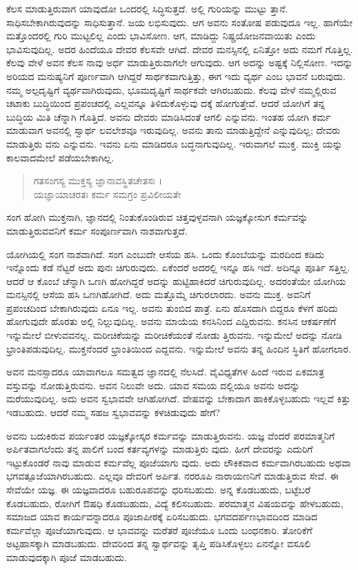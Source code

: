 ಕೆಲಸ ಮಾಡುತ್ತಿರುವಾಗ ಯಾವುದೋ ಒಂದರಲ್ಲಿ ಸಿದ್ಧಿಸುತ್ತದೆ. ಅಲ್ಲಿ ಗುರಿಯನ್ನು ಮುಟ್ಟು ತ್ತಾನೆ. ಸಾಧಿಸಬೇಕಾಗಿರುವುದನ್ನು ಸಾಧಿಸುತ್ತಾನೆ. ಜಯ ಲಭಿಸುವುದು. ಆಗ ಅವನು ಸಂತೋಷ ಪಡುವುದೂ ಇಲ್ಲ. ಹಾಗೆಯೇ ಮತ್ತೊಂದರಲ್ಲಿ ಗುರಿ ಮುಟ್ಟಲಿಲ್ಲ ಎಂದು ಭಾವಿಸೋಣ. ಆಗ, ಮಾಡಿದ್ದು ನಿಷ್ಪ್ರಯೋಜನವಾಯಿತು ಎಂದು ಭಾವಿಸುವುದಿಲ್ಲ. ಅದರ ಹಿಂದೆಯೂ ದೇವರ ಕೆಲಸವೇ ಆಗಿದೆ. ದೇವರ ಮನಸ್ಸಿನಲ್ಲಿ ಏನಿತ್ತೋ ಅದು ನಮಗೆ ಗೊತ್ತಿಲ್ಲ. ಕೆಲವು ವೇಳೆ ಅವನ ಕೆಲಸ ನಾವು ಅರ್ಧ ಮಾಡುತ್ತಿರುವಾಗಲೇ ಆಗುವುದು. ಆಗ ಅದನ್ನು ಅಷ್ಟಕ್ಕೆ ನಿಲ್ಲಿಸೋಣ. ಇದನ್ನು ಅರಿಯದ ಮನುಷ್ಯನಿಗೆ ಪೂರ್ಣವಾಗಿ ಆಗಿದ್ದರೆ ಸಾರ್ಥಕವಾಗುತ್ತಿತ್ತು, ಈಗ ಇದು ವ್ಯರ್ಥ ಎಂಬ ಭಾವನೆ ಬರುವುದು. ನಮ್ಮ ಅಲ್ಪದೃಷ್ಟಿಗೆ ವ್ಯರ್ಥವಾಗಿರುವುದು, ಭೂಮದೃಷ್ಟಿಗೆ ಸಾರ್ಥಕವೇ ಆಗಿರಬಹುದು. ಕೆಲವು ವೇಳೆ ನಮ್ಮಲ್ಲಿರುವ ಚಟಾಕು ಬುದ್ಧಿಯಿಂದ ಪ್ರಪಂಚದಲ್ಲಿ ಎಲ್ಲವನ್ನೂ ತಿಳಿದುಕೊಳ್ಳುವು ದಕ್ಕೆ ಹೋಗುತ್ತೇವೆ. ಆದರೆ ಯೋಗಿಗೆ ತನ್ನ ಬುದ್ಧಿಯ ಮಿತಿ ಚೆನ್ನಾಗಿ ಗೊತ್ತಿದೆ. ಅವನು ದೇವರು ಮಾಡಿಸಿದಂತೆ ಆಗಲಿ ಎನ್ನುವನು. ಇಂತಹ ಯೋಗಿ ಕರ್ಮ ಮಾಡುವಾಗ ಅವನಲ್ಲಿ ಸ್ವಾರ್ಥ ಲವಲೇಶವೂ ಇರುವುದಿಲ್ಲ. ಅವನು ತಾನು ಮಾಡುತ್ತಿದ್ದೇನೆ ಎನ್ನುವುದಿಲ್ಲ; ದೇವರು ಮಾಡುತ್ತಿರು ವನು ಎನ್ನುವನು. ಇವನು ಏನು ಮಾಡಿದರೂ ಬದ್ಧನಾಗುವುದಿಲ್ಲ. ಇರುವಾಗಲೆ ಮುಕ್ತ. ಮುಕ್ತಿ ಯನ್ನು ಕಾಲವಾದಮೇಲೆ ಪಡೆಯಬೇಕಾಗಿಲ್ಲ.

\begin{verse}
ಗತಸಂಗಸ್ಯ ಮುಕ್ತಸ್ಯ ಜ್ಞಾನಾವಸ್ಥಿತಚೇತಸಃ ।\\ಯಜ್ಞಾಯಾಚರತಃ ಕರ್ಮ ಸಮಗ್ರಂ ಪ್ರವಿಲೀಯತೇ 
\end{verse}

{\small ಸಂಗ ಹೋಗಿ ಮುಕ್ತನಾಗಿ, ಜ್ಞಾನದಲ್ಲಿ ನಿಂತುಕೊಂಡಿರುವ ಚಿತ್ತವುಳ್ಳವನಾಗಿ ಯಜ್ಞಕ್ಕೋಸುಗ ಕರ್ಮವನ್ನು ಮಾಡುತ್ತಿರುವವನಿಗೆ ಕರ್ಮ ಸಂಪೂರ್ಣವಾಗಿ ನಾಶವಾಗುತ್ತದೆ.}

ಯೋಗಿಯಲ್ಲಿ ಸಂಗ ನಾಶವಾಗಿದೆ. ಸಂಗ ಎಂಬುದೇ ಆಸೆಯ ಹಸಿ. ಒಂದು ಕೊಂಬೆಯನ್ನು ಮರದಿಂದ ಕಡಿದು ಇನ್ನೊಂದು ಕಡೆ ನೆಟ್ಟರೆ ಅದು ಪುನಃ ಚಿಗುರುವುದು. ಏಕೆಂದರೆ ಅದರಲ್ಲಿ ಇನ್ನೂ ಹಸಿ ಇದೆ. ಅದಿನ್ನೂ ಪೂರ್ತಿ ಸತ್ತಿಲ್ಲ. ಆದರೆ ಆ ಕೊಂಬೆ ಚೆನ್ನಾಗಿ ಒಣಗಿ ಹೋಗಿದ್ದರೆ ಅದನ್ನು ಹುಟ್ಟಿಹಾಕಿದರೆ ಚಿಗುರುವುದಿಲ್ಲ. ಅದರಂತೆಯೇ ಯೋಗಿಯ ಮನಸ್ಸಿನಲ್ಲಿ ಆಸೆಯ ಹಸಿ ಒಣಗಿಹೋಗಿದೆ. ಅದು ಮತ್ತೊಮ್ಮೆ ಚಿಗುರಲಾರದು. ಅವನು ಮುಕ್ತ. ಅವನಿಗೆ ಪ್ರಪಂಚದಿಂದ ಬೇಕಾಗಿರುವುದು ಏನೂ ಇಲ್ಲ. ಅವನು ತುಂಬಿದ ಪಾತ್ರೆ. ಏನು ಹೊಸದಾಗಿ ಬಿದ್ದರೂ ಕೆಳಗೆ ಹರಿದು ಹೋಗುವುದೇ ಹೊರತು ಅಲ್ಲಿ ನಿಲ್ಲುವುದಿಲ್ಲ. ಅವನು ಮಾಯೆಯ ಕನಸಿನಿಂದ ಎದ್ದಿರುವನು. ಕನಸಿನ ಆಕರ್ಷಣೆಗೆ ಇನ್ನುಮೇಲೆ ಬೀಳುವವನಲ್ಲ. ಮರೀಚಿಕೆಯನ್ನು ಮರೀಚಿಕೆಯಂತೆ ನೋಡು ತ್ತಿರುವನು. ಇನ್ನುಮೇಲೆ ಅದನ್ನು ನೋಡಿ ಭ್ರಾಂತಿಪಡುವುದಿಲ್ಲ. ಮುಕ್ತನೆಂದರೆ ಭ್ರಾಂತಿಯಿಂದ ಎದ್ದವನು. ಇನ್ನುಮೇಲೆ ಅವನು ತನ್ನ ಹಿಂದಿನ ಸ್ಥಿತಿಗೆ ಹೋಗಲಾರ.

ಅವನ ಮನಸ್ಸಾದರೂ ಯಾವಾಗಲೂ ಸಮತ್ವದ ಜ್ಞಾನದಲ್ಲಿ ನೆಲಸಿದೆ. ವೈವಿಧ್ಯತೆಗಳ ಹಿಂದೆ ಇರುವ ಏಕಮಾತ್ರ ವಸ್ತುವನ್ನು ನೋಡುತ್ತಿರುವನು. ಅವನ ನಿಲುವೇ ಅದು. ಯಾವ ಸಮಯ ದಲ್ಲಿಯೂ ಅವನು ಅದನ್ನು ಮರೆಯುವುದಿಲ್ಲ. ಅದು ಅವನ ಸ್ವಭಾವವೇ ಆಗಿಹೋಗಿದೆ. ವೇಷವನ್ನು ಬೇಕಾದಾಗ ಹಾಕಿಕೊಳ್ಳಬಹುದು ಇಲ್ಲವೆ ಕಿತ್ತು ಇಡಬಹುದು. ಆದರೆ ನಮ್ಮ ಸಹಜ ಸ್ವಭಾವವನ್ನು ಕಳಚಿಡುವುದು ಹೇಗೆ?

ಅವನು ಬದುಕಿರುವ ಪರ್ಯಂತರ ಯಜ್ಞಕ್ಕೋಸ್ಕರ ಕರ್ಮವನ್ನು ಮಾಡುತ್ತಿರುವನು. ಯಜ್ಞ ವೆಂದರೆ ಪರಮಾತ್ಮನಿಗೆ ಅರ್ಪಿತವಾಗಲೆಂದು ತನ್ನ ಪಾಲಿಗೆ ಬಂದ ಕರ್ತವ್ಯಗಳನ್ನು ಮಾಡುತ್ತಿರು ವುದು. ಹೀಗೆ ದೇವರನ್ನು ಎದುರಿಗೆ ಇಟ್ಟುಕೊಂಡರೆ ನಾವು ಮಾಡುವ ಕರ್ಮವೆಲ್ಲ ಪೂಜೆಯಾಗು ವುದು. ಅದು ಲೌಕಿಕವಾದ ಕರ್ಮವಾಗಿರಬಹುದು ಅಥವಾ ಭಗವತ್ಪೂಜೆಯಾಗಿರಬಹುದು. ಎಲ್ಲವೂ ದೇವರಿಗೆ ಅರ್ಪಿತ. ನರರೂಪಿ ನಾರಾಯಣನಿಗೆ ಮಾಡುತ್ತಿರುವ ಸೇವೆ. ಈ ಸೇವೆಯೇ ಯಜ್ಞ. ಈ ಯಜ್ಞವಾದರೂ ಬಹುರೂಪವನ್ನು ಧರಿಸಬಹುದು. ಅನ್ನ ಕೊಡಬಹುದು, ಬಟ್ಟೆಬರೆ ಕೊಡಬಹುದು, ರೋಗಿಗೆ ಔಷಧಿ ಕೊಡಬಹುದು, ವಿದ್ಯೆ ಕಲಿಸಬಹುದು. ಪರಮಾತ್ಮನ ವಿಷಯವನ್ನು ಹೇಳಬಹುದು, ಸಮಾಜದ ಯಾವ ಕಾರ್ಯವನ್ನಾದರೂ ಪೂಜಾಪೀಠಕ್ಕೆ ಏರಿಸಬಹುದು. ಭಗವದರ್ಪಣಭಾವದಿಂದ ಮಾಡಿದ ಕರ್ಮವೆಲ್ಲಾ ಪೂಜೆಯಾಗುವುದು. ಆ ಭಾವವನ್ನು ಮರೆತರೆ ಪೂಜೆಯೂ ಒಂದು ಬಂಧನಕಾರಿ. ತೋರಿಕೆಗೆ ಅಟ್ಟಹಾಸಕ್ಕಾಗಿ ಮಾಡಬಹುದು. ದೇವರಿಂದ ತನ್ನ ಸ್ವಾರ್ಥವನ್ನು ತೃಪ್ತಿ ಪಡಿಸಿಕೊಳ್ಳಲು ಏನನ್ನೋ ವಸೂಲಿ ಮಾಡುವುದಕ್ಕಾಗಿ ಪೂಜೆ ಮಾಡಬಹುದು.

